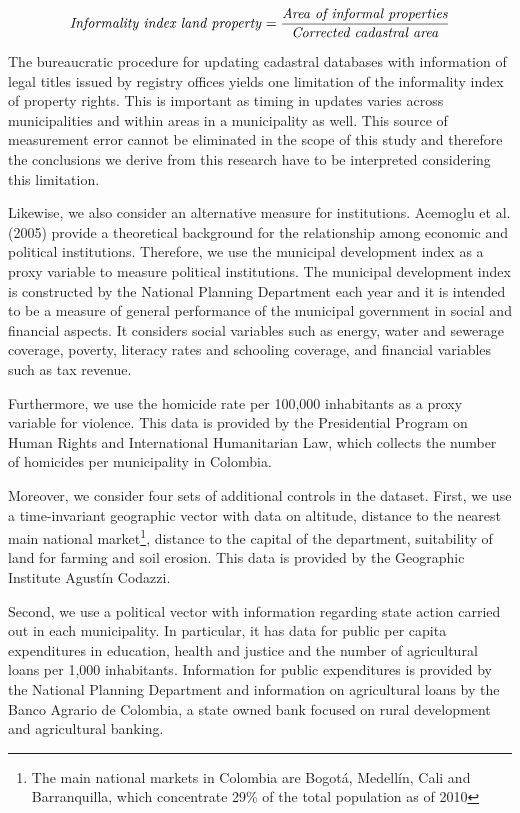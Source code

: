 \documentclass[12pt,a4paper,english]{article}%
\begin{document}
\[
\text{\emph{Informality index land property}}=\frac{\text{\emph{Area of informal properties}}}{\text{\emph{Corrected cadastral area}}}
\]

The bureaucratic procedure for updating cadastral databases with information of legal titles issued by registry offices yields one limitation of the informality index of property rights. This is important as timing in updates varies across municipalities and within areas in a municipality as well. This source of measurement error cannot be eliminated in the scope of this study and therefore the conclusions we derive from this research have to be interpreted considering this limitation.

Likewise, we also consider an alternative measure for institutions. Acemoglu et al. (2005) provide a theoretical background for the relationship among economic and political institutions. Therefore, we use the municipal development index as a proxy variable to measure political institutions. The municipal development index is constructed by the National Planning Department each year and it is intended to be a measure of general performance of the municipal government in social and financial aspects. It considers social variables such as energy, water and sewerage coverage, poverty, literacy rates and schooling coverage, and financial variables such as tax revenue.

Furthermore, we use the homicide rate per 100,000 inhabitants as a proxy variable for violence. This data is provided by the Presidential Program on Human Rights and International Humanitarian Law, which collects the number of homicides per municipality in Colombia.

Moreover, we consider four sets of additional controls in the dataset. First, we use a time-invariant geographic vector with data on altitude, distance to the nearest main national market\footnote{The main national markets in Colombia are Bogot\'{a}, Medell\'{i}n, Cali and Barranquilla, which concentrate 29\% of the total population as of 2010}, distance to the capital of the department, suitability of land for farming and soil erosion. This data is provided by the Geographic Institute Agust\'{i}n Codazzi.

Second, we use a political vector with information regarding state action carried out in each municipality. In particular, it has data for public per capita expenditures in education, health and justice and the number of agricultural loans per 1,000 inhabitants. Information for public expenditures is provided by the National Planning Department and information on agricultural loans by the Banco Agrario de Colombia, a state owned bank focused on rural development and agricultural banking.
\end{document}
